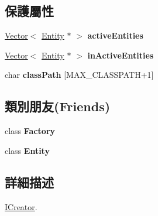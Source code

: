 \subsection*{保護屬性}
\begin{DoxyCompactItemize}
\item 
\hyperlink{class_i_dream_sky_1_1_vector}{Vector}$<$ \hyperlink{class_i_dream_sky_1_1_entity}{Entity} $\ast$ $>$ {\bfseries active\+Entities}\hypertarget{class_i_dream_sky_1_1_entity_1_1_i_creator_ab868d65e6194d75847a2cb937c8bb810}{}\label{class_i_dream_sky_1_1_entity_1_1_i_creator_ab868d65e6194d75847a2cb937c8bb810}

\item 
\hyperlink{class_i_dream_sky_1_1_vector}{Vector}$<$ \hyperlink{class_i_dream_sky_1_1_entity}{Entity} $\ast$ $>$ {\bfseries in\+Active\+Entities}\hypertarget{class_i_dream_sky_1_1_entity_1_1_i_creator_aee412bae3ea7009d47a0bff28220aa2e}{}\label{class_i_dream_sky_1_1_entity_1_1_i_creator_aee412bae3ea7009d47a0bff28220aa2e}

\item 
char {\bfseries class\+Path} \mbox{[}M\+A\+X\+\_\+\+C\+L\+A\+S\+S\+P\+A\+TH+1\mbox{]}\hypertarget{class_i_dream_sky_1_1_entity_1_1_i_creator_adfe2eaf6e711c1cf022c532175f09f24}{}\label{class_i_dream_sky_1_1_entity_1_1_i_creator_adfe2eaf6e711c1cf022c532175f09f24}

\end{DoxyCompactItemize}
\subsection*{類別朋友(Friends)}
\begin{DoxyCompactItemize}
\item 
class {\bfseries Factory}\hypertarget{class_i_dream_sky_1_1_entity_1_1_i_creator_a328c093d609680cca505905c6d49901a}{}\label{class_i_dream_sky_1_1_entity_1_1_i_creator_a328c093d609680cca505905c6d49901a}

\item 
class {\bfseries Entity}\hypertarget{class_i_dream_sky_1_1_entity_1_1_i_creator_a614439ccac0344926adc4c0165d64060}{}\label{class_i_dream_sky_1_1_entity_1_1_i_creator_a614439ccac0344926adc4c0165d64060}

\end{DoxyCompactItemize}


\subsection{詳細描述}
\hyperlink{class_i_dream_sky_1_1_entity_1_1_i_creator}{I\+Creator}. 

